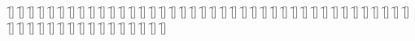\begin{questions}
\begin{multicols}{2}
        \question \f[]
        \question \f[]
        \question \f[]
        \question \f[]
        \question \f[]
        \question \f[]
        \question \f[]
        \question \f[]
        \question \f[]
        \question \f[]
        \question \f[]
        \question \f[]
        \question \f[]
        \question \f[]
        \question \f[]
        \question \f[]
        \question \f[]
        \question \f[]
        \question \f[]
        \question \f[]
        \question \f[]
        \question \f[]
        \question \f[]
        \question \f[]
        \question \f[]
        \question \f[]
        \question \f[]
        \question \f[]
        \question \f[]
        \question \f[]
        \question \f[]
        \question \f[]
        \question \f[]
        \question \f[]
        \question \f[]
        \question \f[]
        \question \f[]
        \question \f[]
        \question \f[]
        \question \f[]
        \question \f[]
        \question \f[]
        \question \f[]
        \question \f[]
        \question \f[]
        \question \f[]
        \question \f[]
        \question \f[]
        \question \f[]
        \question \f[]
        \question \f[]
        \question \f[]
        \question \f[]
        \question \f[]
        \question \f[]
        \question \f[]
    \end{multicols}
\end{questions}
